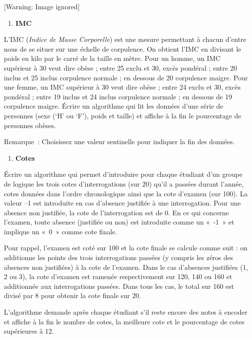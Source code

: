 \begin{center}
 [Warning: Image ignored] %

\end{center}
\liststyleExercice
\setcounter{saveenum}{\value{enumi}}
\begin{enumerate}
\setcounter{enumi}{\value{saveenum}}
\item {\sffamily\bfseries
IMC}
\end{enumerate}
{
L’IMC (\textit{Indice de Masse Corporelle}) est une mesure permettant à
chacun d’entre nous de se situer sur une échelle de corpulence. On
obtient l’IMC en divisant le poids en kilo par le carré de la taille en
mètre. Pour un homme, un IMC supérieur à 30 veut dire obèse ; entre 25
exclu et 30, excès pondéral ; entre 20 inclus et 25 inclus corpulence
normale ; en dessous de 20 corpulence maigre. Pour une femme, un IMC
supérieur à 30 veut dire obèse ; entre 24 exclu et 30, excès pondéral ;
entre 19 inclus et 24 inclus corpulence normale ; en dessous de 19
corpulence maigre. Écrire un algorithme qui lit les données d’une série
de personnes (sexe (‘H’ ou ‘F’), poids et taille) et affiche à la fin
le pourcentage de personnes obèses.}

{
Remarque~: Choisissez une valeur sentinelle pour indiquer la fin des
données.}

\liststyleExercice
\setcounter{saveenum}{\value{enumi}}
\begin{enumerate}
\setcounter{enumi}{\value{saveenum}}
\item {\sffamily\bfseries
Cotes}
\end{enumerate}
{
{Écrire} un algorithme qui permet d’introduire
pour chaque étudiant d’un groupe de logique les trois cotes
d’interrogations (sur 20) qu’il a passées durant l’année, cotes données
dans l’ordre chronologique ainsi que la cote d'examen
(sur 100). La valeur –1 est introduite en cas d’absence justifiée à une
interrogation. Pour une absence non justifiée, la cote de
l’interrogation est de 0. En ce qui concerne l'examen,
toute absence (justifiée ou non) est introduite comme un «~-1~» et
implique un «~0~» comme cote finale.}

{
Pour rappel, l’examen est coté sur 100 et la cote finale se calcule
comme suit : on additionne les points des trois interrogations passées
(y compris les zéros des absences non justifiées) à la cote de
l’examen. Dans le cas d’absences justifiées (1, 2 ou 3), la cote
d’examen est ramenée respectivement sur 120, 140 ou 160 et additionnée
aux interrogations passées. Dans tous les cas, le total sur 160 est
divisé par 8 pour obtenir la cote finale sur 20.}

{
L'algorithme demande après chaque étudiant
s'il reste encore des notes à encoder et affiche à la
fin le nombre de cotes, la meilleure cote et le pourcentage de cotes
supérieures à 12.}

